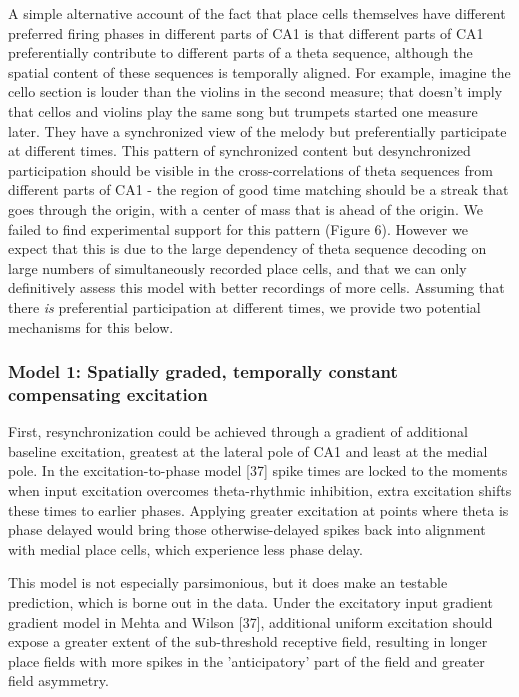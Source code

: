 \documentclass[]{article}
\begin{document}
A simple alternative account of the fact that place cells themselves
have different preferred firing phases in different parts of CA1 is that
different parts of CA1 preferentially contribute to different parts of a
theta sequence, although the spatial content of these sequences is
temporally aligned. For example, imagine the cello section is louder
than the violins in the second measure; that doesn't imply that cellos
and violins play the same song but trumpets started one measure later.
They have a synchronized view of the melody but preferentially
participate at different times. This pattern of synchronized content but
desynchronized participation should be visible in the cross-correlations
of theta sequences from different parts of CA1 - the region of good time
matching should be a streak that goes through the origin, with a center
of mass that is ahead of the origin. We failed to find experimental
support for this pattern (Figure 6). However we expect that this is due
to the large dependency of theta sequence decoding on large numbers of
simultaneously recorded place cells, and that we can only definitively
assess this model with better recordings of more cells. Assuming that
there \emph{is} preferential participation at different times, we
provide two potential mechanisms for this below.

\subsubsection{Model 1: Spatially graded, temporally constant
compensating excitation}

First, resynchronization could be achieved through a gradient of
additional baseline excitation, greatest at the lateral pole of CA1 and
least at the medial pole. In the excitation-to-phase model {[}37{]}
spike times are locked to the moments when input excitation overcomes
theta-rhythmic inhibition, extra excitation shifts these times to
earlier phases. Applying greater excitation at points where theta is
phase delayed would bring those otherwise-delayed spikes back into
alignment with medial place cells, which experience less phase delay.

This model is not especially parsimonious, but it does make an testable
prediction, which is borne out in the data. Under the excitatory input
gradient gradient model in Mehta and Wilson {[}37{]}, additional uniform
excitation should expose a greater extent of the sub-threshold receptive
field, resulting in longer place fields with more spikes in the
'anticipatory' part of the field and greater field asymmetry.
\end{document}
